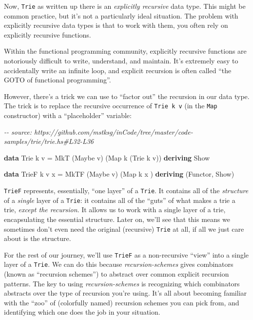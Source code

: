 \documentclass[]{article}
\newenvironment{Shaded}{}{}
\newcommand{\CommentTok}[1]{\textcolor[rgb]{0.38,0.63,0.69}{\textit{#1}}}
\newcommand{\DataTypeTok}[1]{\textcolor[rgb]{0.56,0.13,0.00}{#1}}
\newcommand{\KeywordTok}[1]{\textcolor[rgb]{0.00,0.44,0.13}{\textbf{#1}}}
\newcommand{\NormalTok}[1]{#1}
\newcommand{\OtherTok}[1]{\textcolor[rgb]{0.00,0.44,0.13}{#1}}
\begin{document}
Now, \texttt{Trie} as written up there is an \emph{explicitly recursive} data
type. This might be common practice, but it's not a particularly ideal
situation. The problem with explicitly recursive data types is that to work with
them, you often rely on explicitly recursive functions.

Within the functional programming community, explicitly recursive functions are
notoriously difficult to write, understand, and maintain. It's extremely easy to
accidentally write an infinite loop, and explicit recursion is often called
``the GOTO of functional programming''.

However, there's a trick we can use to ``factor out'' the recursion in our data
type. The trick is to replace the recursive occurrence of \texttt{Trie\ k\ v}
(in the \texttt{Map} constructor) with a ``placeholder'' variable:

\begin{Shaded}
\begin{Highlighting}[]
\CommentTok{{-}{-} source: https://github.com/mstksg/inCode/tree/master/code{-}samples/trie/trie.hs\#L32{-}L36}

\KeywordTok{data} \DataTypeTok{Trie}\NormalTok{  k v   }\OtherTok{=} \DataTypeTok{MkT}\NormalTok{  (}\DataTypeTok{Maybe}\NormalTok{ v) (}\DataTypeTok{Map}\NormalTok{ k (}\DataTypeTok{Trie}\NormalTok{ k v))}
  \KeywordTok{deriving} \DataTypeTok{Show}

\KeywordTok{data} \DataTypeTok{TrieF}\NormalTok{ k v x }\OtherTok{=} \DataTypeTok{MkTF}\NormalTok{ (}\DataTypeTok{Maybe}\NormalTok{ v) (}\DataTypeTok{Map}\NormalTok{ k x         )}
  \KeywordTok{deriving}\NormalTok{ (}\DataTypeTok{Functor}\NormalTok{, }\DataTypeTok{Show}\NormalTok{)}
\end{Highlighting}
\end{Shaded}

\texttt{TrieF} represents, essentially, ``one layer'' of a \texttt{Trie}. It
contains all of the \emph{structure} of a \emph{single} layer of a
\texttt{Trie}: it contains all of the ``guts'' of what makes a trie a trie,
\emph{except the recursion}. It allows us to work with a single layer of a trie,
encapsulating the essential structure. Later on, we'll see that this means we
sometimes don't even need the original (recursive) \texttt{Trie} at all, if all
we just care about is the structure.

For the rest of our journey, we'll use \texttt{TrieF} as a non-recursive
``view'' into a single layer of a \texttt{Trie}. We can do this because
\emph{recursion-schemes} gives combinators (known as ``recursion schemes'') to
abstract over common explicit recursion patterns. The key to using
\emph{recursion-schemes} is recognizing which combinators abstracts over the
type of recursion you're using. It's all about becoming familiar with the
``zoo'' of (colorfully named) recursion schemes you can pick from, and
identifying which one does the job in your situation.
\end{document}
